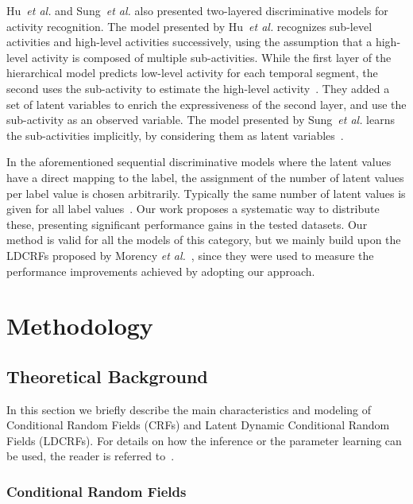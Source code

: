 \documentclass[10pt, conference]{IEEEtran}
\begin{document}
Hu~\textit{et al.} and Sung~\textit{et al.} also presented two-layered discriminative models for activity recognition. The model presented by Hu~\textit{et al.} recognizes sub-level activities and high-level activities successively, using the assumption that a high-level activity is composed of multiple sub-activities. While the first layer of the hierarchical model predicts low-level activity for each temporal segment, the second uses the sub-activity to estimate the high-level activity~\cite{hu2l}. They added a set of latent variables to enrich the expressiveness of the second layer, and use the sub-activity as an observed variable.
The model presented by Sung~\textit{et al.} learns the sub-activities implicitly, by considering them as latent variables~\cite{hmemm}. 


In the aforementioned sequential discriminative models where the latent values have a direct mapping to the label, the assignment of the number of latent values per label value is chosen arbitrarily. Typically the same number of latent values is given for all label values~\cite{mvldcrf,hucrf,ldcrf}. Our work proposes a systematic way to distribute these, presenting significant performance gains in the tested datasets. 
Our method is valid for all the models of this category, but we mainly build upon the LDCRFs proposed by Morency \textit{et al.}~\cite{ldcrf}, since they were used to measure the performance improvements achieved by adopting our approach.

\section{Methodology}
\subsection{Theoretical Background}

In this section we briefly describe the main characteristics and modeling of Conditional Random Fields (CRFs) and Latent Dynamic Conditional Random Fields (LDCRFs). For details on how the inference or the parameter learning can be used, the reader is referred to~\cite{introductioncrfsutton,nowozin}. 

\subsubsection{Conditional Random Fields}
\end{document}
